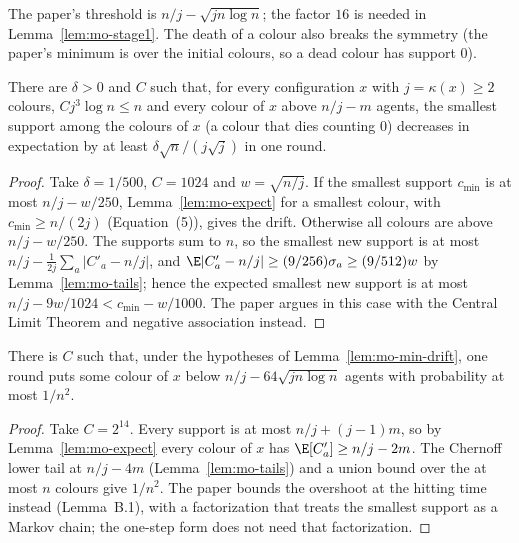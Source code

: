 The paper's threshold is $n/j-\sqrt{jn\log n}$; the factor $16$ is needed in
Lemma~\ref{lem:mo-stage1}. The death of a colour also breaks the symmetry (the paper's minimum
is over the initial colours, so a dead colour has support $0$).

\begin{lemma}[Equation~(3)]\label{lem:mo-min-drift}
\leanok
{}
There are $\delta>0$ and $C$ such that, for every configuration $x$ with $j=\kappa(x)\ge2$
colours, $Cj^3\log n\le n$ and every colour of $x$ above $n/j-m$ agents, the smallest support
among the colours of $x$ (a colour that dies counting $0$) decreases in expectation by at least
$\delta\sqrt n/(j\sqrt j)$ in one round.
\end{lemma}
\begin{proof}\leanok
Take $\delta=1/500$, $C=1024$ and $w=\sqrt{n/j}$. If the smallest support $c_{\min}$ is at most
$n/j-w/250$, Lemma~\ref{lem:mo-expect} for a smallest colour, with $c_{\min}\ge n/(2j)$
(Equation~(5)), gives the drift. Otherwise all colours are above $n/j-w/250$. The supports sum to
$n$, so the smallest new support is at most $n/j-\frac1{2j}\sum_a|C'_a-n/j|$, and
$\E|C'_a-n/j|\ge(9/256)\sigma_a\ge(9/512)w$ by Lemma~\ref{lem:mo-tails}; hence the expected
smallest new support is at most $n/j-9w/1024<c_{\min}-w/1000$. The paper argues in this case with
the Central Limit Theorem and negative association instead.
\end{proof}

\begin{lemma}\label{lem:mo-overshoot}
\leanok
{}
There is $C$ such that, under the hypotheses of Lemma~\ref{lem:mo-min-drift}, one round puts some
colour of $x$ below $n/j-64\sqrt{jn\log n}$ agents with probability at most $1/n^2$.
\end{lemma}
\begin{proof}\leanok
Take $C=2^{14}$. Every support is at most $n/j+(j-1)m$, so by Lemma~\ref{lem:mo-expect} every
colour of $x$ has $\E[C'_a]\ge n/j-2m$. The Chernoff lower tail at $n/j-4m$
(Lemma~\ref{lem:mo-tails}) and a union bound over the at most $n$ colours give $1/n^2$. The paper
bounds the overshoot at the hitting time instead (Lemma~B.1), with a factorization that treats
the smallest support as a Markov chain; the one-step form does not need that factorization.
\end{proof}

